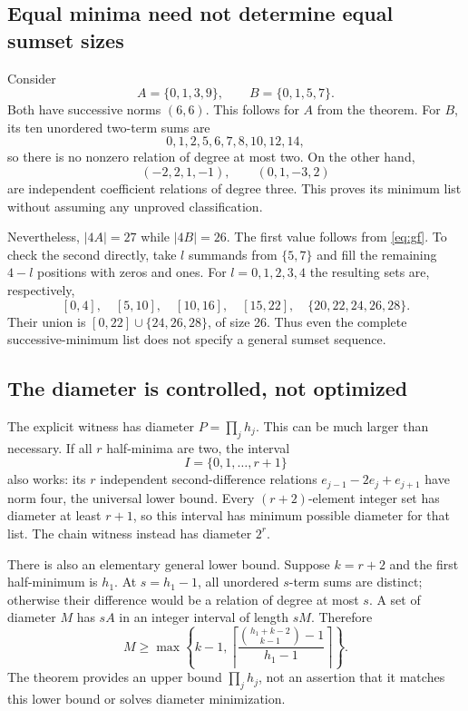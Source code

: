 \documentclass[11pt]{article}
\numberwithin{equation}{section}
\theoremstyle{definition}
\theoremstyle{remark}\newtheorem{remark}[theorem]{Remark}
\begin{document}
\subsection{Equal minima need not determine equal sumset sizes}

Consider
\[
 A=\{0,1,3,9\},\qquad B=\{0,1,5,7\}.
\]
Both have successive norms $(6,6)$.  This follows for $A$ from the theorem.
For $B$, its ten unordered two-term sums are
\[
 0,1,2,5,6,7,8,10,12,14,
\]
so there is no nonzero relation of degree at most two.  On the other hand,
\[
 (-2,2,1,-1),\qquad (0,1,-3,2)
\]
are independent coefficient relations of degree three.  This proves its
minimum list without assuming any unproved classification.

Nevertheless, $|4A|=27$ while $|4B|=26$.  The first value follows from
\eqref{eq:gf}.  To check the second directly, take $l$ summands from
$\{5,7\}$ and fill the remaining $4-l$ positions with zeros and ones.
For $l=0,1,2,3,4$ the resulting sets are, respectively,
\[
 [0,4],\quad [5,10],\quad [10,16],\quad [15,22],
 \quad\{20,22,24,26,28\}.
\]
Their union is $[0,22]\cup\{24,26,28\}$, of size 26.
Thus even the complete successive-minimum list does not specify a general
sumset sequence.

\subsection{The diameter is controlled, not optimized}

The explicit witness has diameter $P=\prod_jh_j$.  This can be much larger
than necessary.  If all $r$ half-minima are two, the interval
\[
 I=\{0,1,\ldots,r+1\}
\]
also works: its $r$ independent second-difference relations
$e_{j-1}-2e_j+e_{j+1}$ have norm four, the universal lower bound.
Every $(r+2)$-element integer set has diameter at least $r+1$, so this
interval has minimum possible diameter for that list.  The chain witness
instead has diameter $2^r$.

There is also an elementary general lower bound.  Suppose $k=r+2$ and the
first half-minimum is $h_1$.  At $s=h_1-1$, all unordered $s$-term sums are
distinct; otherwise their difference would be a relation of degree at most
$s$.  A set of diameter $M$ has $sA$ in an integer interval of length $sM$.
Therefore
\begin{equation}\label{eq:diameter}
 M\ge\max\left\{k-1,
 \left\lceil\frac{\binom{h_1+k-2}{k-1}-1}{h_1-1}\right\rceil\right\}.
\end{equation}
The theorem provides an upper bound $\prod_jh_j$, not an assertion that
it matches this lower bound or solves diameter minimization.
\end{document}
